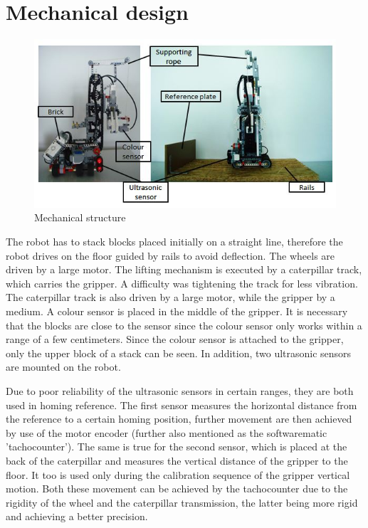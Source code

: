 \documentclass{article}
\begin{document}
	\section{Mechanical design}
	\begin{figure}[H]
		\centering
		\includegraphics[keepaspectratio, width=\textwidth]{Figures/Mechanical_Structure.jpg}
		\caption{Mechanical structure}
		\label{fig:Mechanical}	
	\end{figure}
	
	
	\par The robot has to stack blocks placed initially on a straight line, therefore the robot drives on the floor guided by rails to avoid deflection. The wheels are driven by a large motor. The lifting mechanism is executed by a caterpillar track, which carries the gripper. A difficulty was tightening the track for less vibration. The caterpillar track is also driven by a large motor, while the gripper by a medium. A colour sensor is placed in the middle of the gripper. It is necessary that the blocks are close to the sensor since the colour sensor only works within a range of a few centimeters. Since the colour sensor is attached to the gripper, only the upper block of a stack can be seen. In addition, two ultrasonic sensors are mounted on the robot.
	
	\par Due to poor reliability of the ultrasonic sensors in certain ranges, they are both used in homing reference. The first sensor measures the horizontal distance from the reference to a certain homing position, further movement are then achieved by use of the motor encoder (further also mentioned as the softwarematic 'tachocounter'). The same is true for the second sensor, which is placed at the back of the caterpillar and measures the vertical distance of the gripper to the floor. It too is used only during the calibration sequence of the gripper vertical motion. Both these movement can be achieved by the tachocounter due to the rigidity of the wheel and the caterpillar transmission, the latter being more rigid and achieving a better precision. 
	
\end{document}
